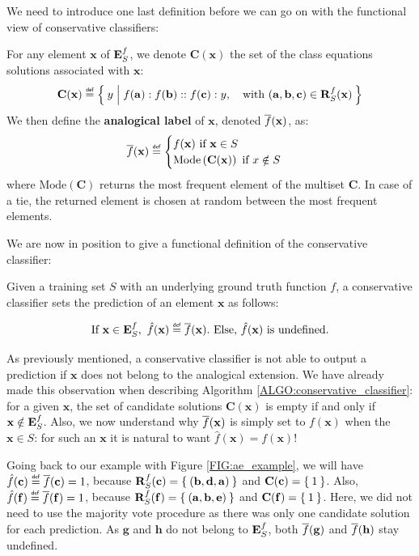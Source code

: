 We need to introduce one last definition before we can go on with the
functional view of conservative classifiers:

\begin{definition}
  \label{DEF:analogical_label}
  For any element $\mathbf{x}$ of $\mathbf{E}_{S}^{f}$, we denote $\mathbf{C}(\mathbf{x})$
  the set of the class equations solutions associated with $\mathbf{x}$:
  $$\mathbf{C}(\mathbf{x}) \eqdef \Set{y | f(\mathbf{a}) : f(\mathbf{b}) ::
  f(\mathbf{c}) :y, \quad \text{with }(\mathbf{a}, \mathbf{b}, \mathbf{c}) \in \rsfx}$$
  We then define the \textbf{analogical
  label} of $\mathbf{x}$, denoted $\overline{f}(\mathbf{x})$, as:
  $$\albl{\mathbf{x}} \eqdef
  \begin{cases}
    f(\mathbf{x}) \text{ if } \mathbf{x} \in S\\
    \text{Mode} \left(\mathbf{C}(\mathbf{x})\right) \text{ if
    } x \notin S
  \end{cases}
  $$
  where $\text{Mode}(\mathbf{C})$ returns the most frequent element of the multiset
$\mathbf{C}$. In case of a tie, the returned element is chosen at random between
the most frequent elements.
\end{definition}

We are now in position to give a functional definition of the conservative
classifier:

\begin{definition}
  \label{DEF:conservative_classifier}
  Given a training set $S$ with an underlying ground truth function $f$,
  a conservative classifier sets the prediction of an element $\mathbf{x}$ as
  follows:

  $$\text{If } \mathbf{x} \in \esf, ~ \hat{f}(\mathbf{x}) \eqdef \albl{\mathbf{x}}.
  \text{ Else, } \hat{f}(\mathbf{x}) \text{ is undefined.}$$
\end{definition}

As previously mentioned, a conservative classifier is not able to output a
prediction if $\mathbf{x}$ does not belong to the analogical extension. We have
already made this observation when describing Algorithm
\ref{ALGO:conservative_classifier}: for a given $\mathbf{x}$, the set of
candidate solutions $\mathbf{C}(\mathbf{x})$ is empty if and only if
$\mathbf{x} \notin \mathbf{E}_{S}^{f}$.  Also, we now understand why $\overline{f}(\mathbf{x})$ is
simply set to $f(\mathbf{x})$ when the $\mathbf{x} \in S$: for such an
$\mathbf{x}$ it is natural to want $\hat{f}(\mathbf{x}) = f(\mathbf{x})$!

\begin{testexample}
Going
back to our example with Figure \ref{FIG:ae_example}, we will have
$\hat{f}(\mathbf{c}) \eqdef \albl{\mathbf{c}} = 1$, because
$\mathbf{R}_{S}^{f}(\mathbf{c}) = \Set{(\mathbf{b}, \mathbf{d},\mathbf{a})}$ and
$\mathbf{C}(\mathbf{c}) = \Set{1}$. Also, $\hat{f}(\mathbf{f}) \eqdef
\albl{\mathbf{f}} = 1$, because $\mathbf{R}_{S}^{f}(\mathbf{f}) =
\Set{(\mathbf{a},\mathbf{b},\mathbf{e})}$ and $\mathbf{C}(\mathbf{f}) =
\Set{1}$. Here, we did not need to use the majority vote procedure as there was
only one candidate solution for each prediction. As $\mathbf{g}$ and
$\mathbf{h}$ do not belong to $\mathbf{E}_{S}^{f}$, both $\overline{f}(\mathbf{g})$ and
$\overline{f}(\mathbf{h})$ stay undefined.
\end{testexample}

